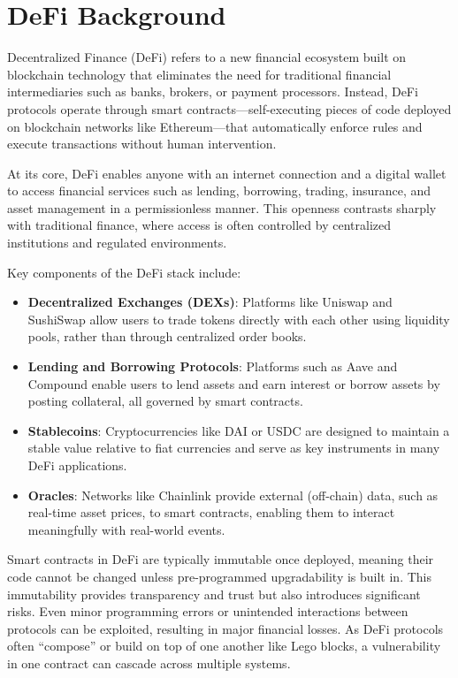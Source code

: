 \documentclass[conference]{IEEEtran}
\begin{document}
\section{DeFi Background}

Decentralized Finance (DeFi) refers to a new financial ecosystem built on blockchain technology that eliminates the need for traditional financial intermediaries such as banks, brokers, or payment processors. Instead, DeFi protocols operate through smart contracts—self-executing pieces of code deployed on blockchain networks like Ethereum—that automatically enforce rules and execute transactions without human intervention.

At its core, DeFi enables anyone with an internet connection and a digital wallet to access financial services such as lending, borrowing, trading, insurance, and asset management in a permissionless manner. This openness contrasts sharply with traditional finance, where access is often controlled by centralized institutions and regulated environments.

Key components of the DeFi stack include:
\begin{itemize}
  \item \textbf{Decentralized Exchanges (DEXs)}: Platforms like Uniswap and SushiSwap allow users to trade tokens directly with each other using liquidity pools, rather than through centralized order books.
  \item \textbf{Lending and Borrowing Protocols}: Platforms such as Aave and Compound enable users to lend assets and earn interest or borrow assets by posting collateral, all governed by smart contracts.
  \item \textbf{Stablecoins}: Cryptocurrencies like DAI or USDC are designed to maintain a stable value relative to fiat currencies and serve as key instruments in many DeFi applications.
  \item \textbf{Oracles}: Networks like Chainlink provide external (off-chain) data, such as real-time asset prices, to smart contracts, enabling them to interact meaningfully with real-world events.
\end{itemize}

Smart contracts in DeFi are typically immutable once deployed, meaning their code cannot be changed unless pre-programmed upgradability is built in. This immutability provides transparency and trust but also introduces significant risks. Even minor programming errors or unintended interactions between protocols can be exploited, resulting in major financial losses. As DeFi protocols often “compose” or build on top of one another like Lego blocks, a vulnerability in one contract can cascade across multiple systems.
\end{document}
